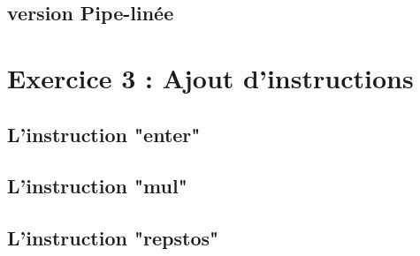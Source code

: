 \documentclass[12pt]{article}
\begin{document}
\subsection{version Pipe-linée}

\section{Exercice 3 : Ajout d'instructions}
\subsection{L'instruction "enter"}

\subsection{L'instruction "mul"}

\subsection{L'instruction "repstos"}
\end{document}
